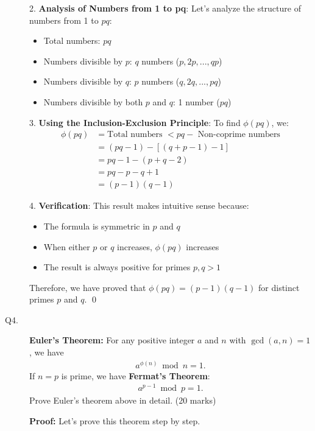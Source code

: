\documentclass[11pt,epsfig]{article}
\begin{document}
\begin{description}
2. \textbf{Analysis of Numbers from 1 to pq}:
    Let's analyze the structure of numbers from 1 to $pq$:
    \begin{itemize}
        \item Total numbers: $pq$
        \item Numbers divisible by $p$: $q$ numbers ($p, 2p, ..., qp$)
        \item Numbers divisible by $q$: $p$ numbers ($q, 2q, ..., pq$)
        \item Numbers divisible by both $p$ and $q$: 1 number ($pq$)
    \end{itemize}

3. \textbf{Using the Inclusion-Exclusion Principle}:
    To find $\phi(pq)$, we:
    \begin{align*}
        \phi(pq) &= \text{Total numbers } < pq - \text{ Non-coprime numbers} \\
                    &= (pq-1) - [(q + p - 1) - 1] \\
                    &= pq - 1 - (p + q - 2) \\
                    &= pq - p - q + 1 \\
                    &= (p-1)(q-1)
    \end{align*}

4. \textbf{Verification}:
    This result makes intuitive sense because:
    \begin{itemize}
        \item The formula is symmetric in $p$ and $q$
        \item When either $p$ or $q$ increases, $\phi(pq)$ increases
        \item The result is always positive for primes $p, q > 1$
    \end{itemize}

Therefore, we have proved that $\phi(pq) = (p-1)(q-1)$ for distinct primes $p$ and $q$. \qed


\item[Q4.] 
{\bf Euler's Theorem:} For any positive integer $a$ and $n$ with $\gcd(a,n)=1$, we have 
\begin{eqnarray*}
a^{\phi(n)} \bmod{n} = 1.
\end{eqnarray*}
If $n=p$ is prime, we have {\bf Fermat's Theorem}:
\begin{eqnarray*}
a^{p-1} \bmod{p} = 1.
\end{eqnarray*} 
Prove Euler's theorem above in detail. \hfill (20 marks)

\noindent \textbf{Proof:} Let's prove this theorem step by step.


\end{description}
\end{document}
